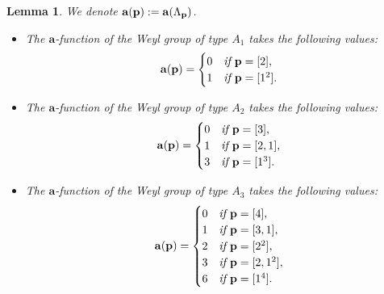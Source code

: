 \documentclass[reqno,12pt]{amsart}
\numberwithin{equation}{section}
\theoremstyle{plain}
\newtheorem{Lem}[Thm]{Lemma}
\theoremstyle{definition}
\newcommand{\aff}{ \mathbf{a} }
\begin{document}




 


\begin{Lem}\label{a-value}
We denote $\aff({\bf p}):=\aff(\Lambda_{{\bf p}})$.
\begin{itemize}\item [(1)]
 The  $\aff$-function of the Weyl group of type $A_1 $ takes the following values:
   $$\aff({\bf p})=\begin{cases}
	0 &\emph{if }{\bf p}=[2],\\
	1 &\emph{if }{\bf p}=[1^2].
	\end{cases}
 $$
    
   
\item [(2)]   The  $\aff$-function of the Weyl group of type $A_2 $ takes the following values:
$$\aff({\bf p})=\begin{cases}
	0 &\emph{if }{\bf p}=[3],\\
	1 &\emph{if }{\bf p}=[2,1],\\
 3 &\emph{if }{\bf p}=[1^3].
	\end{cases}
 $$



   
\item [(3)]   The  $\aff$-function of the Weyl group of type $A_3 $ takes the following values:
$$\aff({\bf p})=\begin{cases}
	0 &\emph{if }{\bf p}=[4],\\
	1 &\emph{if }{\bf p}=[3,1],\\
 2 &\emph{if }{\bf p}=[2^2],\\
 3 &\emph{if }{\bf p}=[2,1^2],\\
 6 &\emph{if }{\bf p}=[1^4].
	\end{cases}
 $$





\end{itemize}
\end{Lem}
\end{document}
